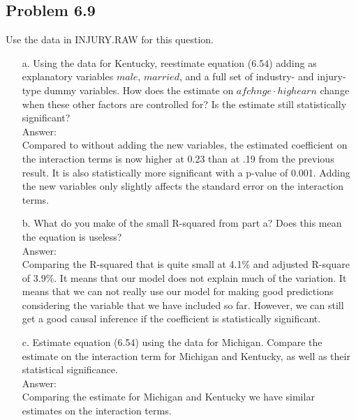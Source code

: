 \documentclass[10pt]{article}
\begin{document}
\subsection*{Problem 6.9}
Use the data in INJURY.RAW for this question. 
\begin{enumerate}
\item[a.] Using the data for Kentucky, reestimate equation (6.54) adding as explanatory variables $male$, $married$, and a full set of industry- and injury-type dummy variables. How does the estimate on $afchnge\cdot highearn$ change when these other factors are controlled for? Is the estimate still statistically significant? 
\\ Answer: \\

Compared to without adding the new variables, the estimated coefficient on the interaction terms is now higher at 0.23 than at .19 from the previous result. It is also statistically more significant with a p-value of 0.001. Adding the new variables only slightly affects the standard error on the interaction terms. 

\item[b.] What do you make of the small R-squared from part a? Does this mean the equation is useless? 
\\ Answer: \\
Comparing the R-squared that is quite small at 4.1\% and adjusted R-square of 3.9\%. It means that our model does not explain much of the variation. It means that we can not really use our model for making good predictions considering the variable that we have included so far. However, we can still get a good causal inference if the coefficient is statistically significant.

\item[c.] Estimate equation (6.54) using the data for Michigan. Compare the estimate on the interaction term for Michigan and Kentucky, as well as their statistical significance.
\\ Answer: \\

Comparing the estimate for Michigan and Kentucky we have similar estimates on the interaction terms.

\end{enumerate}
\end{document}
